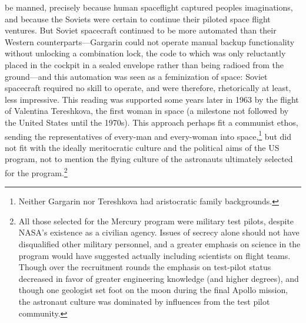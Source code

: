 be manned, precisely because human spaceflight captured peoples
imaginations, and because the Soviets were certain to continue their
piloted space flight ventures. But Soviet spacecraft continued to be
more automated than their Western counterparts---Gargarin could not
operate manual backup functionality without unlocking a combination
lock, the
code to which was only reluctantly placed in the cockpit in a sealed
envelope rather than being radioed from the ground\cite[p. 89]{???-DM}---and
this automation was seen as a feminization of space:  Soviet
spacecraft required no skill to operate, and were therefore,
rhetorically at least, less impressive.\cite{???} This reading was
supported some years later in 1963 by the flight of Valentina
Tereshkova, the 
first woman in space (a milestone not followed by the United States
until the 1970s). This approach perhaps fit a communist ethos, sending
the representatives of every-man and every-woman into
space,\footnote{Neither Gargarin nor Tereshkova had aristocratic
  family backgrounds.} but did
not fit with the ideally meritocratic culture and the political aims
of the US program, not to mention the flying culture of the astronauts
ultimately selected for the program.\footnote{All those selected for
  the Mercury program were military test pilots, despite NASA's
  existence as a civilian agency.\cite{???-DM} Issues of secrecy alone
should not have disqualified other military personnel, and a greater
emphasis on science in the program would have suggested actually
including scientists on flight teams.\cite{???-DM} Though over the recruitment
rounds the emphasis on test-pilot status decreased in favor of greater
engineering knowledge (and higher degrees), and though one geologist
set foot on the moon during the final Apollo mission, the astronaut
culture was dominated by influences from the test pilot community.}




